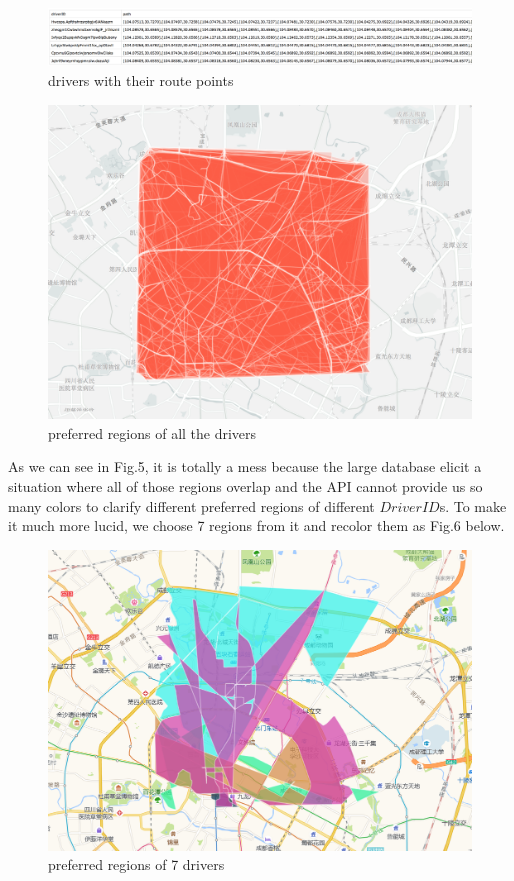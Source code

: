 \documentclass[10pt,journal]{IEEEtran}
\begin{document}
\begin{figure}[!ht]
    \centering
    \includegraphics[width=0.9\columnwidth]{Fig/driverID.png}
    \caption{drivers with their route points}
 \end{figure}

\begin{figure}[!ht]
    \centering
    \includegraphics[width=0.8\columnwidth]{Fig/preferred_region_all.png}
    \caption{preferred regions of all the drivers}
 \end{figure}
 
 As we can see in Fig.5, it is totally a mess because the large database elicit a situation where all of those regions overlap and the API cannot provide us so many colors to clarify different preferred regions of different $Driver ID$s. To make it much more lucid, we choose 7 regions from it and recolor them as Fig.6 below.
 
 \begin{figure}[!ht]
    \centering
    \includegraphics[width=0.7\columnwidth]{Fig/preferred_region_7.png}
    \caption{preferred regions of 7 drivers}
 \end{figure}
 
\end{document}
